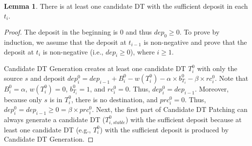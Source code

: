 \documentclass[10pt, conference, letterpaper]{IEEEtran}
\theoremstyle{definition}
\newtheorem{lemma}{Lemma}
\begin{document}
\begin{lemma} \label{lemma: deposit constraint}
There is at least one candidate DT %
with the sufficient deposit
in each $t_i$.
\end{lemma}
\begin{proof}
The deposit in the beginning is $0$ and thus $dep_0\geq 0$. To prove by induction, we assume that the deposit at $t_{i-1}$ is non-negative and prove that the deposit at $t_i$ is non-negative (i.e., $dep_i\geq 0$), where $i\geq 1$.

Candidate DT Generation creates at least one candidate DT $T_{i}^{0}$ with only the source $s$ and deposit $dep_{i}^{0}=dep_{i-1}+B_{i}^{0}-w(T_{i}^{0})-\alpha\times b_{T_i}^{0}-\beta \times rc_{i}^{0}$. 
Note that $B_{i}^{0}=\alpha$, $w(T_{i}^{0})=0$, $b_{T_i}^{0}=1$, and $rc_{i}^{0}=0$. Thus, $dep_{i}^{0}=dep_{i-1}$. Moreover, because only $s$ is in $T_{i}^{0}$, there is no destination, and $prc_{i}^{0}=0$. Thus, $dep_{i}^{0}=dep_{i-1}\geq 0= \beta \times prc_{i}^{0}$.
Next, the first part of Candidate DT Patching can always generate a candidate DT ($T_{i,stable}^0$) 
with the sufficient deposit
because at least one candidate DT (e.g., $T_{i}^0$)
with the sufficient deposit
is produced by Candidate DT Generation.


\end{proof}
\end{document}
